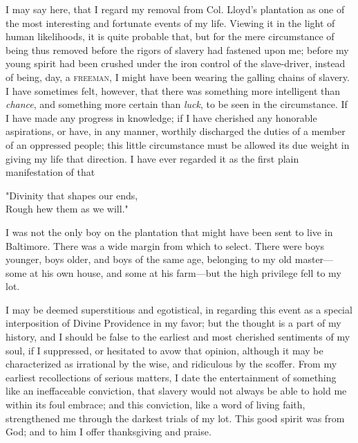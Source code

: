 I may say here, that I regard my removal from Col. Lloyd's plantation as
one of the most interesting and fortunate events of my life. Viewing it
in the light of human likelihoods, it is quite probable that, but for
the mere circumstance of being thus removed before the rigors of slavery
had fastened upon me; before my young spirit had been crushed under the
iron control of the slave-driver, instead of being, {}day, a
\textsc{freeman}, I might have been wearing the galling chains of
slavery. I have sometimes felt, however, that there was something more
intelligent than \emph{chance}, and something more certain than
\emph{luck}, to be seen in the circumstance. If I have made any progress
in knowledge; if I have cherished any honorable aspirations, or have, in
any manner, worthily discharged the duties of a member of an oppressed
people; this little circumstance must be allowed its due weight in
giving my life that direction. I have ever regarded it as the first
plain manifestation of that

"Divinity that shapes our ends,\\
Rough hew them as we will."

I was not the only boy on the plantation that might have been sent to
live in Baltimore. There was a wide margin from which to select. There
were boys younger, boys older, and boys of the same age, belonging to my
old master---some at his own house, and some at his farm---but the high
privilege fell to my lot.

I may be deemed superstitious and egotistical, in regarding this event
as a special interposition of Divine Providence in my favor; but the
thought is a part of my history, and I should be false to the earliest
and most cherished sentiments of my soul, if I suppressed, or hesitated
to avow that opinion, although it may be characterized as irrational by
the wise, and ridiculous by the scoffer. From my earliest recollections
of serious matters, I date the entertainment of something like an
ineffaceable conviction, that slavery would not always be able to {}hold
me within its foul embrace; and this conviction, like a word of living
faith, strengthened me through the darkest trials of my lot. This good
spirit was from God; and to him I offer thanksgiving and praise.
